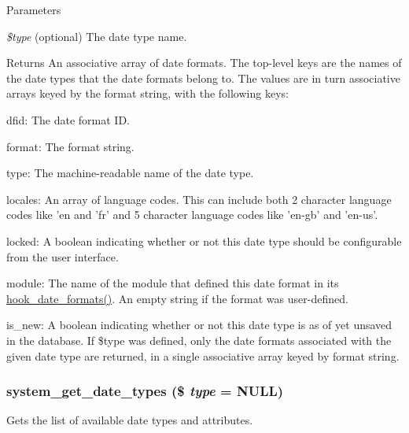 \begin{DoxyParams}{Parameters}
\item[{\em \$type}](optional) The date type name.\end{DoxyParams}
\begin{DoxyReturn}{Returns}
An associative array of date formats. The top-\/level keys are the names of the date types that the date formats belong to. The values are in turn associative arrays keyed by the format string, with the following keys:
\begin{DoxyItemize}
\item dfid: The date format ID.
\item format: The format string.
\item type: The machine-\/readable name of the date type.
\item locales: An array of language codes. This can include both 2 character language codes like 'en and 'fr' and 5 character language codes like 'en-\/gb' and 'en-\/us'.
\item locked: A boolean indicating whether or not this date type should be configurable from the user interface.
\item module: The name of the module that defined this date format in its \hyperlink{group__hooks_ga2a190ba304193ab7752bfc489463a0d7}{hook\_\-date\_\-formats()}. An empty string if the format was user-\/defined.
\item is\_\-new: A boolean indicating whether or not this date type is as of yet unsaved in the database. If \$type was defined, only the date formats associated with the given date type are returned, in a single associative array keyed by format string. 
\end{DoxyItemize}
\end{DoxyReturn}
\hypertarget{system_8module_a591ee79a1b5ebbcbc8b2162a74e965b2}{
\subsubsection[{system\_\-get\_\-date\_\-types}]{\setlength{\rightskip}{0pt plus 5cm}system\_\-get\_\-date\_\-types (\$ {\em type} = {\ttfamily NULL})}}
\label{system_8module_a591ee79a1b5ebbcbc8b2162a74e965b2}
Gets the list of available date types and attributes.


